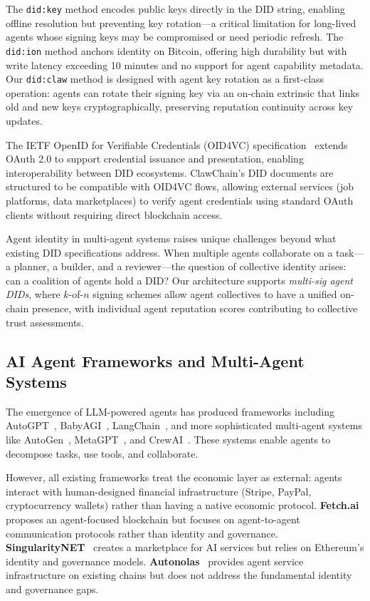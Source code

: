 \documentclass[conference]{IEEEtran}
\begin{document}
The \texttt{did:key} method encodes public keys directly in the DID string, enabling offline resolution but preventing key rotation---a critical limitation for long-lived agents whose signing keys may be compromised or need periodic refresh. The \texttt{did:ion} method anchors identity on Bitcoin, offering high durability but with write latency exceeding 10 minutes and no support for agent capability metadata. Our \texttt{did:claw} method is designed with agent key rotation as a first-class operation: agents can rotate their signing key via an on-chain extrinsic that links old and new keys cryptographically, preserving reputation continuity across key updates.

The IETF OpenID for Verifiable Credentials (OID4VC) specification~\cite{sporny2024vc} extends OAuth 2.0 to support credential issuance and presentation, enabling interoperability between DID ecosystems. ClawChain's DID documents are structured to be compatible with OID4VC flows, allowing external services (job platforms, data marketplaces) to verify agent credentials using standard OAuth clients without requiring direct blockchain access.

Agent identity in multi-agent systems raises unique challenges beyond what existing DID specifications address. When multiple agents collaborate on a task---a planner, a builder, and a reviewer---the question of collective identity arises: can a coalition of agents hold a DID? Our architecture supports \textit{multi-sig agent DIDs}, where $k$-of-$n$ signing schemes allow agent collectives to have a unified on-chain presence, with individual agent reputation scores contributing to collective trust assessments.

\subsection{AI Agent Frameworks and Multi-Agent Systems}

The emergence of LLM-powered agents has produced frameworks including AutoGPT~\cite{richards2023autogpt}, BabyAGI~\cite{nakajima2023babyagi}, LangChain~\cite{langchain2023}, and more sophisticated multi-agent systems like AutoGen~\cite{wu2023autogen}, MetaGPT~\cite{hong2024metagpt}, and CrewAI~\cite{crewai2024}. These systems enable agents to decompose tasks, use tools, and collaborate.

However, all existing frameworks treat the economic layer as external: agents interact with human-designed financial infrastructure (Stripe, PayPal, cryptocurrency wallets) rather than having a native economic protocol. \textbf{Fetch.ai}~\cite{fetchai2019} proposes an agent-focused blockchain but focuses on agent-to-agent communication protocols rather than identity and governance. \textbf{SingularityNET}~\cite{singularitynet2019} creates a marketplace for AI services but relies on Ethereum's identity and governance models. \textbf{Autonolas}~\cite{autonolas2023} provides agent service infrastructure on existing chains but does not address the fundamental identity and governance gaps.
\end{document}

